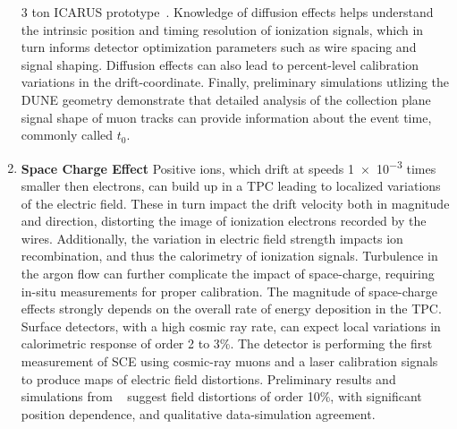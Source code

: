 \begin{enumerate}
\num{3} ton ICARUS prototype~\cite{bib:ICARUSdiffusion}. Knowledge of diffusion effects helps understand the intrinsic position and timing resolution of ionization signals, which in turn informs detector optimization parameters such as wire spacing and signal shaping. Diffusion effects can also lead to percent-level calibration variations in the drift-coordinate. Finally, preliminary simulations utlizing the DUNE  geometry demonstrate that detailed analysis of the collection plane signal shape of   muon tracks can provide information about the event time, commonly called $t_0$. 
\item \textbf{Space Charge Effect} Positive ions, which drift at speeds \num{1e-3} %
times smaller then electrons, can build up in a TPC leading to localized variations of the electric field. These in turn impact the drift velocity both in magnitude and direction, distorting the image of ionization electrons recorded by the wires. Additionally, the variation in electric field strength impacts ion recombination, and thus the calorimetry of ionization signals. Turbulence in the argon flow can further complicate the impact of space-charge, requiring in-situ measurements for proper calibration. The magnitude of space-charge effects strongly depends on the overall rate of energy deposition in the TPC. Surface detectors, with a high cosmic ray rate, can expect local variations in calorimetric response of order \num{2} to \num{3}\%. The  detector is performing the first measurement of SCE using cosmic-ray muons and a laser calibration signals to produce maps of electric field distortions. Preliminary results and simulations from ~\cite{bib:uBspacecharge} suggest field distortions of order \num{10}\%, with significant position dependence, and qualitative data-simulation agreement.
\end{enumerate}

